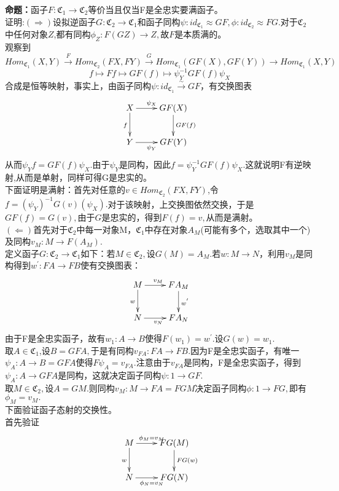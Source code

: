 \documentclass[UTF8]{article}
\begin{document}
  \textbf{命题：}函子$F:\mathfrak{C}_{1}\rightarrow \mathfrak{C}_{2}$等价当且仅当F是全忠实要满函子。\\
  证明:$(\Rightarrow)$设拟逆函子$G:\mathfrak{C}_{2}\rightarrow \mathfrak{C}_{1}$和函子同构$\psi:id_{\mathfrak{C}_{1}} \approx GF,\phi: id_{\mathfrak{C}_{2}}\approx FG .$对于$\mathfrak{C}_{2}$中任何对象$Z$,都有同构$\phi_{Z}:F(GZ)\rightarrow Z,$故$F$是本质满的。\\
  观察到$$
  Hom_{\mathfrak{C}_{1}}(X,Y)\stackrel{F}\rightarrow Hom_{\mathfrak{C}_{2}}(FX,FY)\stackrel{G}\rightarrow Hom_{\mathfrak{C}_{1}}(GF(X),GF(Y))\rightarrow Hom_{\mathfrak{C}_{1}}(X,Y)
  $$
$$
f\longmapsto Ff\longmapsto GF(f)\longmapsto \psi_{Y}^{-1}GF(f)\psi_{X}
$$  
合成是恒等映射，事实上，由函子同构$\psi :id_{\mathfrak{C}_{1}}\stackrel{\sim}{\rightarrow} GF$，有交换图表
$$\xymatrix{ X\ar[r]^{\psi_X}\ar[d]_{f} & GF(X)\ar[d]^{GF(f)}\\
Y\ar[r]_{\psi_Y} & GF(Y)  }   $$    
从而$\psi_{Y}f=GF(f)\psi_{X}.$由于$\psi_{Y}$是同构，因此$f=\psi_{Y}^{-1}GF(f)\psi_{X}.$这就说明F有逆映射,从而是单射，同样可得G是忠实的。\\
下面证明是满射：首先对任意的$v\in Hom_{\mathfrak{C}_{2}}(FX,FY)$,令$f=(\psi_{Y})^{-1}G(v)(\psi_{X}).$对于该映射，上交换图依然交换，于是$GF(f)=G(v),$由于$G$是忠实的，得到$F(f)=v,$从而是满射。\\
$(\Leftarrow)$首先对于$\mathfrak{C}_{2}$中每一对象M，$\mathfrak{C}_{1}$中存在对象$A_{M}$(可能有多个，选取其中一个)及同构$v_{M}:M\rightarrow F(A_{M}).$\\
定义函子$G:\mathfrak{C}_{2}\rightarrow \mathfrak{C}_{1}$如下：若$M\in \mathfrak{C}_{2},$设$G(M)=A_{M}.$若$w:M\rightarrow N$，利用$v_{M}$是同构得到$w^{'}:FA\rightarrow FB$使有交换图表：
$$
\xymatrix{M\ar[r]^{v_{M}}\ar[d]_{w}&FA_{M}\ar[d]^{w^{'}}\\
	N\ar[r]_{v_{N}}&FA_{N}
}
$$ 
由于F是全忠实函子，故有$w_{1}:A\rightarrow B$使得$F(w_{1})=w^{'}.$设$G(w)=w_{1}.$\\
取$A\in \mathfrak{C}_{1}$,设$B=GFA,$于是有同构$v_{FA}:FA\rightarrow FB.$因为F是全忠实函子，有唯一$\psi_{A}:A\rightarrow B=GFA$使得$F\psi_{A}=v_{FA}.$注意由于$v_{FA}$是同构，F是全忠实函子，得到$\psi_{A}:A
\rightarrow GFA$是同构，这就决定函子同构$\psi:1\rightarrow GF.$\\
取$M\in \mathfrak{C}_{2},$设$A=GM.$则同构$v_{M}:M\rightarrow FA=FGM$决定函子同构$\phi :1\rightarrow FG,$即有$\phi_{M}=v_{M}.$\\
下面验证函子态射的交换性。\\
首先验证$$
\xymatrix{M\ar[r]^{\phi_{M}=v_{M}}\ar[d]_{w}&FG(M)\ar[d]^{FG(w)}\\
	N\ar[r]_{\phi_{N}=v_{N}}&FG(N)
}
$$
\end{document}
